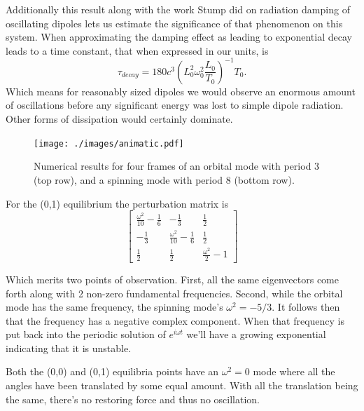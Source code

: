 \documentclass[prbg,preprint]{revtex4-1}
\begin{document}
Additionally this result along with the work Stump did on radiation damping of oscillating dipoles \cite{Stump:1997aa} lets us estimate the significance of that phenomenon on this system. When approximating the damping effect as leading to exponential decay leads to a time constant, that when expressed in our units, is 
\begin{equation}
\tau_{decay}=180 c^3 \left (L_0^2 \omega_0^2\frac{L_0}{T_0} \right)^{-1}T_0. 
\end{equation}
Which means for reasonably sized dipoles we would observe an enormous amount of oscillations before any significant energy was lost to simple dipole radiation. Other forms of dissipation would certainly dominate.


\begin{figure}[h]
	\texttt{[image: ./images/animatic.pdf]} 
  \caption{Numerical results for  four frames of an orbital mode with period 3 (top row), and a spinning mode with period 8 (bottom row).}
  
\end{figure}

For the (0,1) equilibrium the perturbation matrix is 
\begin{equation}
	\left[\begin{matrix}\frac{\omega^{2}}{10} - \frac{1}{6} & - \frac{1}{3} & \frac{1}{2}\\
	- \frac{1}{3} & \frac{\omega^{2}}{10} - \frac{1}{6} & \frac{1}{2}\\
	\frac{1}{2} & \frac{1}{2} & \frac{\omega^{2}}{2} - 1\end{matrix}\right]\end{equation}

Which merits two points of observation. First, all the same eigenvectors come forth along with 2 non-zero fundamental frequencies. Second, while the orbital mode has the same frequency, the spinning mode's $\omega^2=-5/3$. It follows then that the frequency has a negative complex component. When that frequency is put back into the periodic solution of $e^{i\omega t}$ we'll have a growing exponential indicating that it is unstable.

Both the (0,0) and (0,1) equilibria points have an $\omega^2=0$ mode where all the angles have been translated by some equal amount. With all the translation being the same, there's no restoring force and thus no oscillation.
\end{document}

